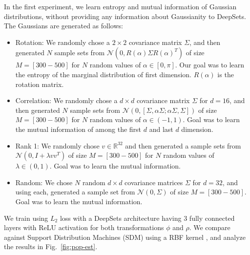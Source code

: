\documentclass{article}
\newcommand{\reffig}[1]{Fig.~\ref{#1}}
\newcommand{\deepsets}{DeepSets\xspace}
\begin{document}
In the first experiment, we learn entropy and mutual information of Gaussian distributions, without providing any information about Gaussianity to \deepsets. The Gaussians are generated as follows:
\vspace{-2.5mm}
\begin{itemize}[leftmargin=3mm, itemsep=0.7mm,partopsep=0mm,parsep=0mm]
\item Rotation: We randomly chose a $2 \times 2$ covariance matrix $\Sigma$, and then generated $N$ sample sets from $\mathcal{N}(0, R(\alpha)\Sigma R(\alpha)^T)$ of size $M=[300-500]$ for $N$ random values of $\alpha \in [0,\pi]$. Our goal was to learn the entropy of the marginal distribution of first dimension. $R(\alpha)$ is the rotation matrix.
\item Correlation: We randomly chose a $d \times d$ covariance matrix $\Sigma$ for $d=16$, and then generated $N$ sample sets from $\mathcal{N}(0, [\Sigma, \alpha\Sigma; \alpha\Sigma, \Sigma] )$ of size $M=[300-500]$ for $N$ random values of $\alpha \in (-1, 1)$. Goal was to learn the mutual information of among the first $d$ and last $d$ dimension.
\item Rank 1: We randomly chose $v\in\mathbb{R}^{32}$ and then generated a sample sets from $\mathcal{N}(0, I + \lambda vv^T)$ of size $M=[300-500]$ for $N$ random values of $\lambda\in (0,1)$. Goal was to learn the  mutual information.
\item Random: We chose $N$ random $d \times d$ covariance matrices $\Sigma$ for $d=32$, and using each, generated a sample set from $\mathcal{N}(0, \Sigma)$ of size $M=[300-500]$. Goal was to learn the  mutual information.
\end{itemize}
\vspace{-2.5mm}
We train using $L_2$ loss with a \deepsets architecture having 3 fully connected layers with ReLU activation for both transformations $\phi$ and $\rho$.
We compare against Support Distribution Machines (SDM) using a RBF kernel \cite{poczos12SDM}, and analyze the results in \reffig{fig:pop-est}.

\vspace{-1mm}
\end{document}
